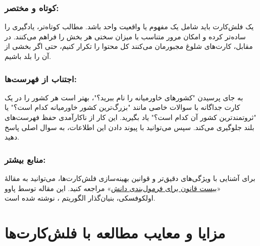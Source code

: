 \documentclass[12pt]{report}
\begin{document}
    \subsubsection{کوتاه و مختصر:} یک فلش‌کارت باید شامل یک مفهوم یا واقعیت واحد باشد. مطالب کوتاه‌تر، یادگیری را ساده‌تر کرده و امکان مرور متناسب با میزان سختی هر بخش را فراهم می‌کنند. در مقابل، کارت‌های شلوغ مجبورمان می‌کنند کل محتوا را تکرار کنیم، حتی اگر بخشی از آن را بلد باشیم.

    \subsubsection{اجتناب از فهرست‌ها:} به جای پرسیدن "کشورهای خاورمیانه را نام ببرید؟"، بهتر است هر کشور را در یک کارت جداگانه با سوالات خاصی مانند "بزرگ‌ترین کشور خاورمیانه کدام است؟" یا "ثروتمندترین کشور آن کدام است؟" یاد بگیرید. این کار از ناکارآمدی حفظ فهرست‌های بلند جلوگیری می‌کند. سپس می‌توانید با پیوند دادن این اطلاعات، به سوال اصلی پاسخ دهید.
    
    \subsubsection{منابع بیشتر:} برای آشنایی با ویژگی‌های دقیق‌تر و قوانین بهینه‌سازی فلش‌کارت‌ها، می‌توانید به مقالهٔ 
    «\href{https://super-memory.com/articles/20rules.htm}{بیست قانون برای فرمول‌بندی دانش}»
\cite{20rules}
    مراجعه کنید. این مقاله توسط پاوو اولکوفسکی، بنیان‌گذار الگوریتم ، نوشته شده است.

\section{مزایا و معایب مطالعه با فلش‌کارت‌ها}
\end{document}
